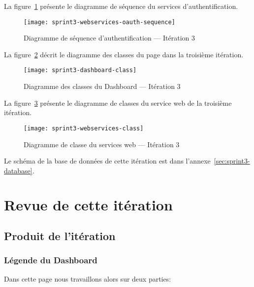 La figure~\ref{fig:sprint3-webservices-oauth-sequence} présente le diagramme de
séquence du services d'authentification.

\begin{figure}[H]
    \centering
    \texttt{[image: sprint3-webservices-oauth-sequence]}
    \caption{Diagramme de séquence d'authentification --- Itération 3}
\label{fig:sprint3-webservices-oauth-sequence}
\end{figure}

La figure~\ref{fig:sprint3-dashboard-classs} décrit le diagramme des classes du
page  dans la troisième itération.

\begin{figure}[H]
    \centering
    \texttt{[image: sprint3-dashboard-class]}
    \caption{Diagramme des classes du Dashboard --- Itération 3}
\label{fig:sprint3-dashboard-classs}
\end{figure}

La figure~\ref{fig:sprint3-webservices-class} présente le diagramme de classes
du service web de la troisième itération.

\begin{figure}[H]
    \centering
    \texttt{[image: sprint3-webservices-class]}
    \caption{Diagramme de classe du services web --- Itération 3}
\label{fig:sprint3-webservices-class}
\end{figure}

Le schéma de la base de données de cette itération est dans
l'annexe~\ref{sec:sprint3-database}.

\section{Revue de cette itération}


\subsection{Produit de l'itération}

\subsubsection{Légende du Dashboard}

Dans cette page nous travaillons alors sur deux parties:

